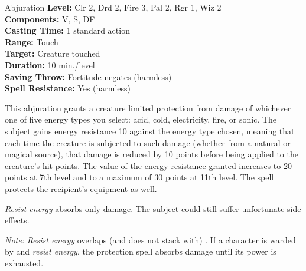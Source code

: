 {Abjuration}
{
	\textbf{Level:}
	Clr 2, Drd 2, Fire 3, Pal 2, Rgr 1, Wiz 2\\
	\textbf{Components:}
	V, S, DF\\
	\textbf{Casting Time:}
	1 standard action\\
	\textbf{Range:}
	Touch\\
	\textbf{Target:}
	Creature touched\\
	\textbf{Duration:}
	10 min./level\\
	\textbf{Saving Throw:}
	Fortitude negates (harmless)\\
	\textbf{Spell Resistance:}
	Yes (harmless)\\
}
{
	This abjuration grants a creature limited protection from damage of whichever one of five energy types you select: acid, cold, electricity, fire, or sonic. The subject gains energy resistance 10 against the energy type chosen, meaning that each time the creature is subjected to such damage (whether from a natural or magical source), that damage is reduced by 10 points before being applied to the creature's hit points. The value of the energy resistance granted increases to 20 points at 7th level and to a maximum of 30 points at 11th level. The spell protects the recipient's equipment as well.

	\emph{Resist energy} absorbs only damage. The subject could still suffer unfortunate side effects.

	\textit{Note:} \emph{Resist energy} overlaps (and does not stack with) . If a character is warded by  and \emph{resist energy}, the protection spell absorbs damage until its power is exhausted.

}
